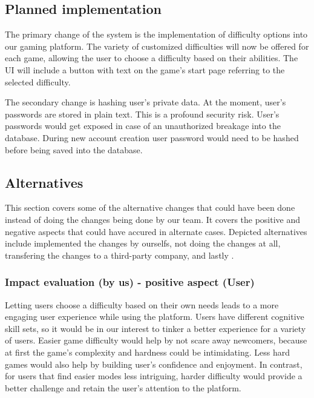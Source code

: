 \documentclass[11pt,a4paper]{article}
\begin{document}
\subsection{Planned implementation}
The primary change of the system is the implementation of difficulty options into our gaming platform. The variety of customized difficulties will now be offered for each game, allowing the user to choose a difficulty based on their abilities. The UI will include a button with text on the game's start page referring to the selected difficulty. 

The secondary change is hashing user's private data. At the moment, user's passwords are stored in plain text. This is a profound security risk. User's passwords would get exposed in case of an unauthorized breakage into the database. During new account creation user password would need to be hashed before being saved into the database.


\subsection{Alternatives}
This section covers some of the alternative changes that could have been done instead of doing the changes being done by our team. It covers the positive and negative aspects that could have accured in alternate cases. Depicted alternatives include implemented the changes by ourselfs, not doing the changes at all, transfering the changes to a third-party company, and lastly .


\subsubsection{Impact evaluation (by us) - positive aspect (User)}
Letting users choose a difficulty based on their own needs leads to a more engaging user experience while using the platform. Users have different cognitive skill sets, so it would be in our interest to tinker a better experience for a variety of users. Easier game difficulty would help by not scare away newcomers, because at first the game's complexity and hardness could be intimidating. Less hard games would also help by building user's confidence and enjoyment. In contrast, for users that find easier modes less intriguing, harder difficulty would provide a better challenge and retain the user's attention to the platform.
\end{document}
